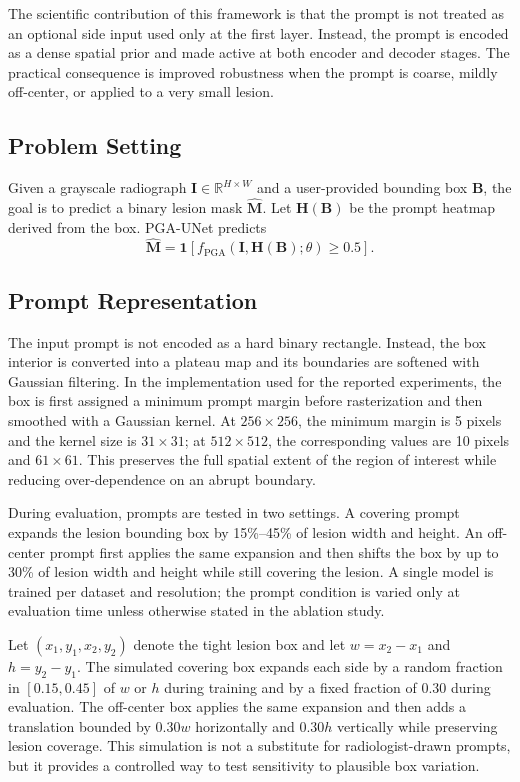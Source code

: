 \documentclass{ieeeaccess}
\begin{document}
The scientific contribution of this framework is that the prompt is not treated as an optional side input used only at the first layer. Instead, the prompt is encoded as a dense spatial prior and made active at both encoder and decoder stages. The practical consequence is improved robustness when the prompt is coarse, mildly off-center, or applied to a very small lesion.

\subsection{Problem Setting}
Given a grayscale radiograph $\mathbf{I}\in\mathbb{R}^{H\times W}$ and a user-provided bounding box $\mathbf{B}$, the goal is to predict a binary lesion mask $\hat{\mathbf{M}}$. Let $\mathbf{H}(\mathbf{B})$ be the prompt heatmap derived from the box. PGA-UNet predicts
\begin{equation}
\hat{\mathbf{M}} = \mathbf{1}\left[f_{\mathrm{PGA}}\left(\mathbf{I},\mathbf{H}(\mathbf{B});\theta\right)\ge 0.5\right].
\end{equation}

\subsection{Prompt Representation}
The input prompt is not encoded as a hard binary rectangle. Instead, the box interior is converted into a plateau map and its boundaries are softened with Gaussian filtering. In the implementation used for the reported experiments, the box is first assigned a minimum prompt margin before rasterization and then smoothed with a Gaussian kernel. At $256\times256$, the minimum margin is 5 pixels and the kernel size is $31\times31$; at $512\times512$, the corresponding values are 10 pixels and $61\times61$. This preserves the full spatial extent of the region of interest while reducing over-dependence on an abrupt boundary.

During evaluation, prompts are tested in two settings. A covering prompt expands the lesion bounding box by 15\%--45\% of lesion width and height. An off-center prompt first applies the same expansion and then shifts the box by up to 30\% of lesion width and height while still covering the lesion. A single model is trained per dataset and resolution; the prompt condition is varied only at evaluation time unless otherwise stated in the ablation study.

Let $(x_1,y_1,x_2,y_2)$ denote the tight lesion box and let $w=x_2-x_1$ and $h=y_2-y_1$. The simulated covering box expands each side by a random fraction in $[0.15,0.45]$ of $w$ or $h$ during training and by a fixed fraction of 0.30 during evaluation. The off-center box applies the same expansion and then adds a translation bounded by $0.30w$ horizontally and $0.30h$ vertically while preserving lesion coverage. This simulation is not a substitute for radiologist-drawn prompts, but it provides a controlled way to test sensitivity to plausible box variation.
\end{document}
